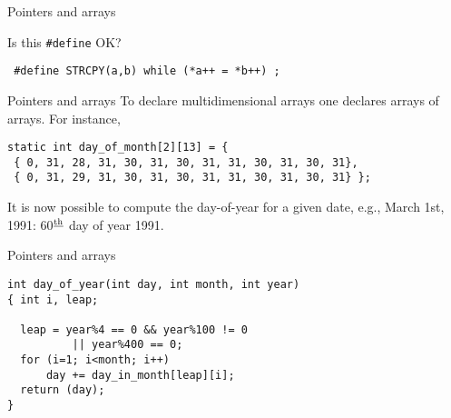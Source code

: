 \begin{frame}[fragile]{Pointers and arrays}

Is this {\tt \#define} OK?
\begin{center}\tt
\#define STRCPY(a,b) while (*a++ = *b++) ;
\end{center}


\end{frame}
\begin{frame}[fragile]{Pointers and arrays}
To declare multidimensional arrays one declares arrays of arrays.
For instance,


\vspace{20pt}

\begin{tt}
\begin{verbatim}
static int day_of_month[2][13] = {
 { 0, 31, 28, 31, 30, 31, 30, 31, 31, 30, 31, 30, 31},
 { 0, 31, 29, 31, 30, 31, 30, 31, 31, 30, 31, 30, 31} };
\end{verbatim}
\end{tt}


\vspace{20pt}

It is now possible to compute the day-of-year for a given
date, e.g., March 1st, 1991:
60${}^{\underline{\rm th}}$ day of year 1991.      \label{bisest}

\end{frame}
\begin{frame}[fragile]{Pointers and arrays}
\begin{tt}
\begin{verbatim}
int day_of_year(int day, int month, int year)
{ int i, leap;

  leap = year%4 == 0 && year%100 != 0
          || year%400 == 0;
  for (i=1; i<month; i++)
      day += day_in_month[leap][i];
  return (day);
}
\end{verbatim}
\end{tt}


\end{frame}
